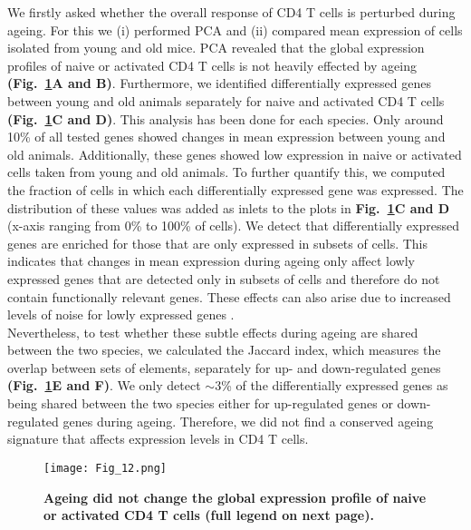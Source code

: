 We firstly asked whether the overall response of CD4\plus{} T cells is perturbed during ageing. For this we (i) performed PCA and (ii) compared mean expression of cells isolated from young and old mice. PCA revealed that the global expression profiles of naive or activated CD4\plus{} T cells is not heavily effected by ageing \textbf{(Fig.~\ref{fig1:mean_expression_ageing}A and B)}. Furthermore, we identified differentially expressed genes between young and old animals separately for naive and activated CD4\plus{} T cells \textbf{(Fig.~\ref{fig1:mean_expression_ageing}C and D)}. This analysis has been done for each species. Only around 10\% of all tested genes showed changes in mean expression between young and old animals. Additionally, these genes showed low expression in naive or activated cells taken from young and old animals. To further quantify this, we computed the fraction of cells in which each differentially expressed gene was expressed. The distribution of these values was added as inlets to the plots in \textbf{Fig.~\ref{fig1:mean_expression_ageing}C and D} (x-axis ranging from 0\% to 100\% of cells). We detect that differentially expressed genes are enriched for those that are only expressed in subsets of cells. This indicates that changes in mean expression during ageing only affect lowly expressed genes that are detected only in subsets of cells and therefore do not contain functionally relevant genes. These effects can also arise due to increased levels of noise for lowly expressed genes \citep{Brennecke2013}. \\

Nevertheless, to test whether these subtle effects during ageing are shared between the two species, we calculated the Jaccard index, which measures the overlap between sets of elements, separately for up- and down-regulated genes \textbf{(Fig.~\ref{fig1:mean_expression_ageing}E and F)}. We only detect $\sim$3\% of the differentially expressed genes as being shared between the two species either for up-regulated genes or down-regulated genes during ageing. Therefore, we did not find a conserved ageing signature that affects expression levels in CD4\plus{} T cells.

\newpage

\begin{figure}[!ht]
\centering
\texttt{[image: Fig\_12.png]}
\caption[Global immune response during ageing]{\textbf{Ageing did not change the global expression profile of naive or activated CD4\plus{} T cells (full legend on next page).}}
\label{fig1:mean_expression_ageing}
\end{figure}

